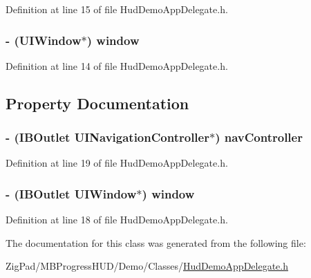 Definition at line 15 of file HudDemoAppDelegate.h.

\hypertarget{interface_hud_demo_app_delegate_ae04748cdefebda525b266731b6c120a2}{
\subsubsection[{window}]{\setlength{\rightskip}{0pt plus 5cm}-\/ (UIWindow$\ast$) {\bf window}}}
\label{interface_hud_demo_app_delegate_ae04748cdefebda525b266731b6c120a2}


Definition at line 14 of file HudDemoAppDelegate.h.



\subsection{Property Documentation}
\hypertarget{interface_hud_demo_app_delegate_a155d6597b8f13f7e9196524c36c73803}{
\subsubsection[{navController}]{\setlength{\rightskip}{0pt plus 5cm}-\/ (IBOutlet UINavigationController$\ast$) {\bf navController}}}
\label{interface_hud_demo_app_delegate_a155d6597b8f13f7e9196524c36c73803}


Definition at line 19 of file HudDemoAppDelegate.h.

\hypertarget{interface_hud_demo_app_delegate_a055d472434a4ee0b915c207957a400e1}{
\subsubsection[{window}]{\setlength{\rightskip}{0pt plus 5cm}-\/ (IBOutlet UIWindow$\ast$) {\bf window}}}
\label{interface_hud_demo_app_delegate_a055d472434a4ee0b915c207957a400e1}


Definition at line 18 of file HudDemoAppDelegate.h.



The documentation for this class was generated from the following file:\begin{DoxyCompactItemize}
\item 
ZigPad/MBProgressHUD/Demo/Classes/\hyperlink{_hud_demo_app_delegate_8h}{HudDemoAppDelegate.h}\end{DoxyCompactItemize}
